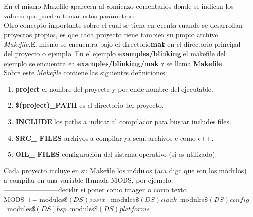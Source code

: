 \documentclass[12pt,letterpaper]{article}
\begin{document}
En el mismo Makefile aparecen al comienzo comentarios donde se indican los valores que pueden tomar estos parámetros.\\

Otro concepto importante sobre el cual se tiene en cuenta cuando se desarrollan proyectos propios, es que cada proyecto tiene también su propio archivo \textit{Makefile}.El mismo se encuentra bajo el directorio\textbf{mak} en el directorio principal del proyecto o ejemplo. En el ejemplo \textbf{examples/blinking} el makefile del ejemplo se encuentra en \textbf{examples/blinking/mak} y se llama \textbf{Makefile}.\\

Sobre este \textit{Makefile} contiene las siguientes definiciones:

\begin{enumerate}
\item \textbf{project} el nombre del proyecto y por ende nombre del ejecutable.
\item \textbf{\$(project)\_PATH} es el directorio del proyecto.
\item \textbf{INCLUDE} los paths a indicar al compilador para buscar includes files.
\item \textbf{SRC\_ FILES} archivos a compilar ya sean archivos c como c++.
\item \textbf{OIL\_ FILES} configuración del sistema operativo (si es utilizado).
\end{enumerate}

Cada proyecto incluye en su Makefile los módulos (aca digo que son los módulos) a compilar en una variable llamada MODS, por ejemplo:\\
------------------------decidir si poner como imagen o como texto\\
MODS += modules$\$(DS)posix$ \
        modules$\$(DS)ciaak $\
        modules$\$(DS)config$ \
        modules$\$(DS)bsp $\
        modules$\$(DS)platforms$\\
\end{document}
